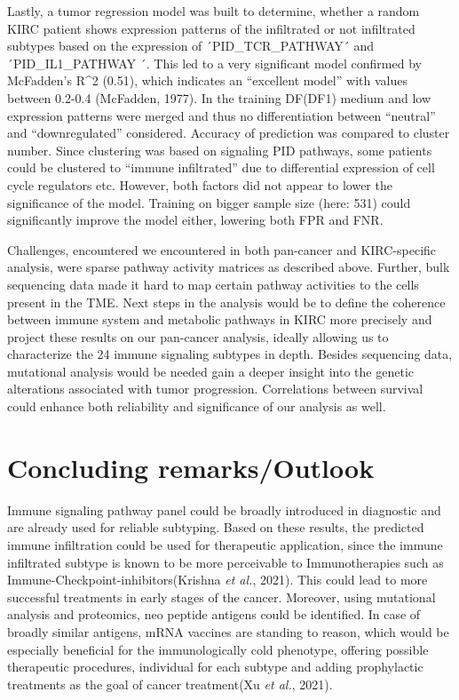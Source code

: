 \documentclass[
  parskip,
  oneside]{scrreprt}
\begin{document}
Lastly, a tumor regression model was built to determine, whether a
random KIRC patient shows expression patterns of the infiltrated or not
infiltrated subtypes based on the expression of ´PID\_TCR\_PATHWAY´ and
´PID\_IL1\_PATHWAY ´. This led to a very significant model confirmed by
McFadden's R\^{}2 (0.51), which indicates an ``excellent model'' with
values between 0.2-0.4 (McFadden, 1977). In the training DF(DF1) medium
and low expression patterns were merged and thus no differentiation
between ``neutral'' and ``downregulated'' considered. Accuracy of
prediction was compared to cluster number. Since clustering was based on
signaling PID pathways, some patients could be clustered to ``immune
infiltrated'' due to differential expression of cell cycle regulators
etc. However, both factors did not appear to lower the significance of
the model. Training on bigger sample size (here: 531) could
significantly improve the model either, lowering both FPR and FNR.

Challenges, encountered we encountered in both pan-cancer and
KIRC-specific analysis, were sparse pathway activity matrices as
described above. Further, bulk sequencing data made it hard to map
certain pathway activities to the cells present in the TME. Next steps
in the analysis would be to define the coherence between immune system
and metabolic pathways in KIRC more precisely and project these results
on our pan-cancer analysis, ideally allowing us to characterize the 24
immune signaling subtypes in depth. Besides sequencing data, mutational
analysis would be needed gain a deeper insight into the genetic
alterations associated with tumor progression. Correlations between
survival could enhance both reliability and significance of our analysis
as well.

\hypertarget{concluding-remarksoutlook}{%
\chapter{Concluding remarks/Outlook}\label{concluding-remarksoutlook}}

Immune signaling pathway panel could be broadly introduced in diagnostic
and are already used for reliable subtyping. Based on these results, the
predicted immune infiltration could be used for therapeutic application,
since the immune infiltrated subtype is known to be more perceivable to
Immunotherapies such as Immune-Checkpoint-inhibitors(Krishna \emph{et
al.}, 2021). This could lead to more successful treatments in early
stages of the cancer. Moreover, using mutational analysis and
proteomics, neo peptide antigens could be identified. In case of broadly
similar antigens, mRNA vaccines are standing to reason, which would be
especially beneficial for the immunologically cold phenotype, offering
possible therapeutic procedures, individual for each subtype and adding
prophylactic treatments as the goal of cancer treatment(Xu \emph{et
al.}, 2021).
\end{document}

